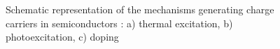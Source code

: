 \begin{figure}[h]
\centering

\caption{Schematic representation of the mechanisms generating charge carriers in semiconductors \citep{finklea1983-1}: 
a) thermal excitation, b) photoexcitation, c) doping}
\label{fig_excitation_carrier}
\end{figure}